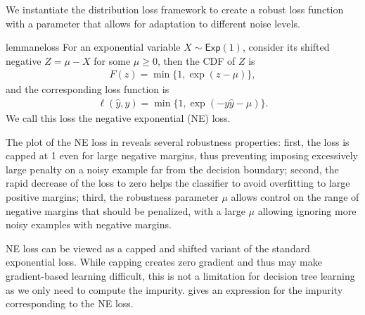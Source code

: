 \documentclass[letterpaper]{article} %
\begin{document}
We instantiate the distribution loss framework to create a robust loss function
with a parameter that allows for adaptation to different noise levels.
\begin{restatable}{lemma}{neloss}
\label{lem:neloss}
	For an exponential variable $X \sim \mathsf{Exp}(1)$, consider its shifted
	negative $Z=\mu - X$ for some $\mu \ge 0$, then the CDF of $Z$ is 
	\begin{align*}
	    F(z) = \min\{1,\exp(z-\mu)\},
	\end{align*}
	and the corresponding loss function is 
	\begin{align*}
	    \ell(\widehat{y},y)=\min\{1,\exp(-y\widehat{y}-\mu)\}.
	\end{align*}
	We call this loss the negative exponential (NE) loss. 
\end{restatable}

The plot of the NE loss in  reveals several robustness
properties:
first, the loss is capped at 1 even for large negative margins, thus preventing
imposing excessively large penalty on a noisy example far from the decision
boundary;
second, the rapid decrease of the loss to zero helps the classifier to avoid
overfitting to large positive margins;
third, the robustness parameter $\mu$ allows control on the range of negative
margins that should be penalized, with a large $\mu$ allowing ignoring more
noisy examples with negative margins.

NE loss can be viewed as a capped and shifted variant of the standard
exponential loss.
While capping creates zero gradient and thus may make gradient-based learning
difficult, this is not a limitation for decision tree learning as we only
need to compute the impurity.
 gives an expression for the impurity corresponding to the NE
loss.
\end{document}
